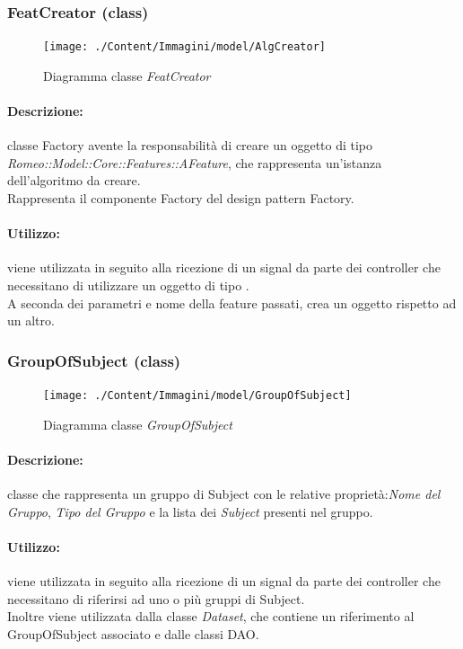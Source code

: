 	\subsubsection{FeatCreator (class)}
	\begin{figure}[!h]
		\centering
		\texttt{[image: ./Content/Immagini/model/AlgCreator]}
		\caption{Diagramma classe \textsl{FeatCreator}}
	\end{figure}
	\paragraph{Descrizione:} classe Factory avente la responsabilità di creare un oggetto di tipo \textsl{Romeo::Model::Core::Features::AFeature}, che rappresenta un’istanza dell’algoritmo da creare.
\\Rappresenta il componente Factory del design pattern\g{} Factory.
	\paragraph{Utilizzo:} viene utilizzata in seguito alla ricezione di un signal\g{} da parte dei controller che necessitano di utilizzare un oggetto di tipo .
\\A seconda dei parametri e nome della feature\g{} passati, crea un oggetto rispetto ad un altro.
	\subsubsection{GroupOfSubject (class)}
	\begin{figure}[!h]
		\centering
		\texttt{[image: ./Content/Immagini/model/GroupOfSubject]}
		\caption{Diagramma classe \textsl{GroupOfSubject}}
	\end{figure}
	\paragraph{Descrizione:} classe che rappresenta un gruppo di Subject\g{} con le relative proprietà:\emph{Nome del Gruppo}, \emph{Tipo del Gruppo} e la lista dei \emph{Subject} presenti nel gruppo.
	\paragraph{Utilizzo:} viene utilizzata in seguito alla ricezione di un signal\g{} da
parte dei controller che necessitano di riferirsi ad uno o più gruppi di Subject\g{}.
\\Inoltre viene utilizzata dalla classe \textsl{Dataset}, che contiene un riferimento al GroupOfSubject\g{} associato e dalle classi DAO.
